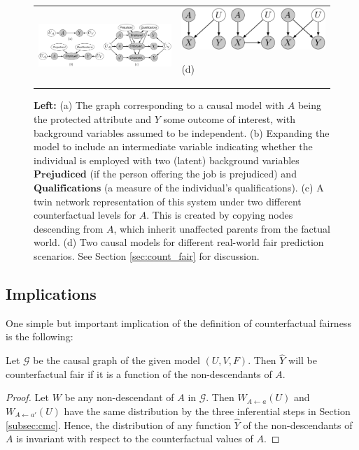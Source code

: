\begin{figure}
  \begin{tabular}{p{}|p{}}
    \centerline{\includegraphics[width=0.5\columnwidth]{implications_fig.pdf}}&
    \centerline{\includegraphics[width=0.5\columnwidth]{simple_models_no_q3}}(d)
  \end{tabular}
  \caption{\label{fig:ex1} {\bf Left:} (a) The graph corresponding to
    a causal model with $A$ being the protected attribute and $Y$ some
    outcome of interest, with background variables assumed to be
    independent.  (b) Expanding the model to include an intermediate
    variable indicating whether the individual is employed with two
    (latent) background variables $\textbf{Prejudiced}$ (if the person
    offering the job is prejudiced) and $\textbf{Qualifications}$ (a
    measure of the individual's qualifications). (c) A twin network
    representation of this system \citep{pearl:00} under two different
    counterfactual levels for $A$. This is created by copying nodes
    descending from $A$, which inherit unaffected parents from the
    factual world. (d) Two causal models for different
    real-world fair prediction scenarios.\label{figure.simple_models}
    See Section \ref{sec:count_fair} for discussion.}
\end{figure}

\subsection{Implications}
%
One simple but important implication of the definition of counterfactual fairness is the following:
%
\begin{lem}
  \label{lem:nondescend}
  Let $\mathcal G$ be the causal graph of the given model $(U, V, F)$.
  Then $\hat Y$ will be counterfactual fair if it is a function
  of the non-descendants of $A$.
\end{lem}
%
\begin{proof}
 Let $W$ be any non-descendant of $A$ in $\mathcal G$. Then $W_{A
   \leftarrow a}(U)$ and $W_{A \leftarrow a'}(U)$ have the same
 distribution by the three inferential steps in Section
 \ref{subsec:cmc}.  Hence, the distribution of any function $\hat Y$ of the non-descendants of $A$
 is invariant with respect to the counterfactual values of $A$.
\end{proof}

